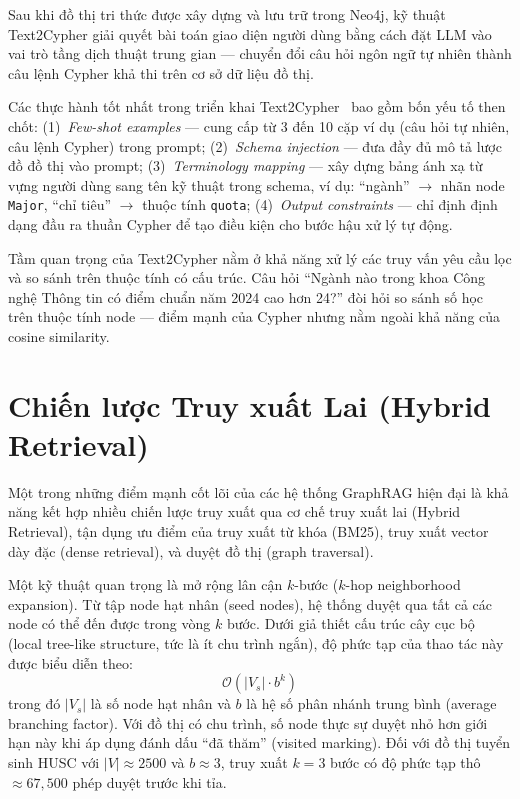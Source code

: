 \documentclass[12pt,a4paper]{report}
\theoremstyle{plain}
\theoremstyle{definition}
\begin{document}
	Sau khi đồ thị tri thức được xây dựng và lưu trữ trong Neo4j, kỹ thuật
	Text2Cypher giải quyết bài toán giao diện người dùng bằng cách đặt LLM vào
	vai trò tầng dịch thuật trung gian --- chuyển đổi câu hỏi ngôn ngữ tự nhiên
	thành câu lệnh Cypher khả thi trên cơ sở dữ liệu đồ thị.
	
	Các thực hành tốt nhất trong triển khai Text2Cypher~\cite{neo4j2024essential}
	bao gồm bốn yếu tố then chốt: (1)~\emph{Few-shot examples} --- cung cấp từ 3
	đến 10 cặp ví dụ (câu hỏi tự nhiên, câu lệnh Cypher) trong prompt; (2)~\emph{Schema
		injection} --- đưa đầy đủ mô tả lược đồ đồ thị vào prompt; (3)~\emph{Terminology
		mapping} --- xây dựng bảng ánh xạ từ vựng người dùng sang tên kỹ thuật trong
	schema, ví dụ: ``ngành'' $\to$ nhãn node \texttt{Major}, ``chỉ tiêu'' $\to$
	thuộc tính \texttt{quota}; (4)~\emph{Output constraints} --- chỉ định định dạng
	đầu ra thuần Cypher để tạo điều kiện cho bước hậu xử lý tự động.
	
	Tầm quan trọng của Text2Cypher nằm ở khả năng xử lý các truy vấn yêu cầu lọc
	và so sánh trên thuộc tính có cấu trúc. Câu hỏi ``Ngành nào trong khoa Công
	nghệ Thông tin có điểm chuẩn năm 2024 cao hơn 24?'' đòi hỏi so sánh số học
	trên thuộc tính node --- điểm mạnh của Cypher nhưng nằm ngoài khả năng của
	cosine similarity.
	
	\section{Chiến lược Truy xuất Lai (Hybrid Retrieval)}
	\label{sec:hybrid_retrieval}
	
	Một trong những điểm mạnh cốt lõi của các hệ thống GraphRAG hiện đại là khả
	năng kết hợp nhiều chiến lược truy xuất qua cơ chế truy xuất lai (Hybrid
	Retrieval), tận dụng ưu điểm của truy xuất từ khóa (BM25), truy xuất vector
	dày đặc (dense retrieval), và duyệt đồ thị (graph traversal).
	
	
	Một kỹ thuật quan trọng là mở rộng lân cận $k$-bước ($k$-hop neighborhood
	expansion). Từ tập node hạt nhân (seed nodes), hệ thống duyệt qua tất cả các
	node có thể đến được trong vòng $k$ bước. Dưới giả thiết cấu trúc cây cục bộ
	(local tree-like structure, tức là ít chu trình ngắn), độ phức tạp của thao
	tác này được biểu diễn theo:
	\begin{equation}
		\mathcal{O}\!\left(|V_s| \cdot b^k\right)
		\label{eq:khop_complexity}
	\end{equation}
	trong đó $|V_s|$ là số node hạt nhân và $b$ là hệ số phân nhánh trung bình
	(average branching factor). Với đồ thị có chu trình, số node thực sự duyệt
	nhỏ hơn giới hạn này khi áp dụng đánh dấu ``đã thăm'' (visited marking).
	Đối với đồ thị tuyển sinh HUSC với $|V| \approx 2500$ và $b \approx 3$,
	truy xuất $k=3$ bước có độ phức tạp thô $\approx 67{,}500$ phép duyệt trước
	khi tỉa.
	
\end{document}
